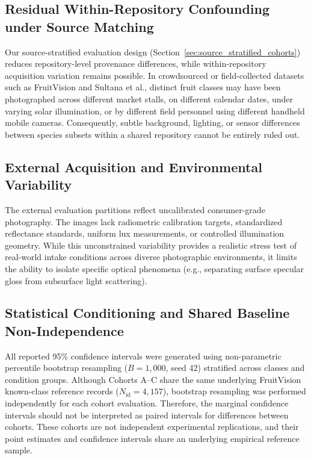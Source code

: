 \vspace*{-10pt}\subsection{Residual Within-Repository Confounding under Source Matching}
\vspace*{-3pt}
\label{sec:limitations_source_matching}

Our source-stratified evaluation design (Section~\ref{sec:source_stratified_cohorts}) reduces repository-level provenance differences, while within-repository acquisition variation remains possible. In crowdsourced or field-collected datasets such as FruitVision and Sultana et al., distinct fruit classes may have been photographed across different market stalls, on different calendar dates, under varying solar illumination, or by different field personnel using different handheld mobile cameras. Consequently, subtle background, lighting, or sensor differences between species subsets within a shared repository cannot be entirely ruled out.

\vspace*{-10pt}\subsection{External Acquisition and Environmental Variability}
\vspace*{-3pt}
\label{sec:limitations_external_acquisition}

The external evaluation partitions reflect uncalibrated consumer-grade photography. The images lack radiometric calibration targets, standardized reflectance standards, uniform lux measurements, or controlled illumination geometry. While this unconstrained variability provides a realistic stress test of real-world intake conditions across diverse photographic environments, it limits the ability to isolate specific optical phenomena (e.g., separating surface specular gloss from subsurface light scattering).

\vspace*{-10pt}\subsection{Statistical Conditioning and Shared Baseline Non-Independence}
\vspace*{-3pt}
\label{sec:limitations_statistical_conditioning}

All reported 95\% confidence intervals were generated using non-parametric percentile bootstrap resampling ($B = 1,000$, seed 42) stratified across classes and condition groups. Although Cohorts A--C share the same underlying FruitVision known-class reference records ($N_{\text{id}} = 4,157$), bootstrap resampling was performed independently for each cohort evaluation. Therefore, the marginal confidence intervals should not be interpreted as paired intervals for differences between cohorts. These cohorts are not independent experimental replications, and their point estimates and confidence intervals share an underlying empirical reference sample.

